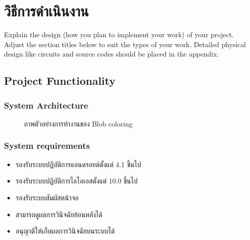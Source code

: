 \documentclass[12pt,oneside,openright,a4paper]{cpe-thai-project}
\begin{document}
\chapter{วิธีการดำเนินงาน}

Explain the design (how you plan to implement your work) of your project. Adjust the section titles below to suit the types of your work. Detailed physical design like circuits and source codes should be placed in the appendix.

\section{Project Functionality}
\subsection{System Architecture}
\begin{figure}[!ht]\centering
  \setlength{\fboxrule}{0.2mm} %
  \setlength{\fboxsep}{1cm}
  \caption{ภาพตัวอย่างการทำงานของ Blob coloring}\label{fig:system}
\end{figure}
\subsection{System requirements}
\begin{itemize}
  \item รองรับระบบปฏิบัติการแอนดรอยด์ตั้งแต่ 4.1 ขึ้นไป
  \item รองรับระบบปฏิบัติการไอโอเอสตั้งแต่ 10.0 ขึ้นไป
  \item รองรับระบบสัมผัสหน้าจอ
  \item สามารถดูผลการวินิจฉัยย้อนหลังได้
  \item อนุญาติให้เก็บผลการวินิจฉัยบนระบบได้
\end{itemize}
\end{document}
